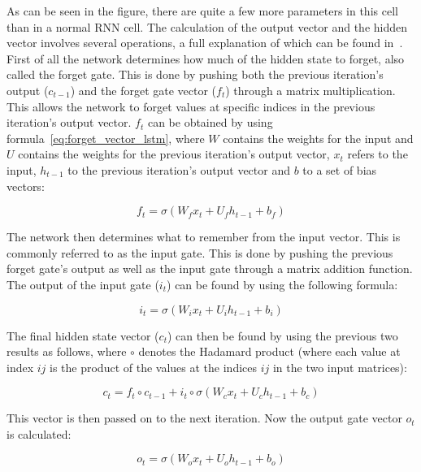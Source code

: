 As can be seen in the figure, there are quite a few more parameters in this cell than in a normal RNN cell. The calculation of the output vector and the hidden vector involves several operations, a full explanation of which can be found in~\cite{olah2015understanding}. First of all the network determines how much of the hidden state to forget, also called the forget gate. This is done by pushing both the previous iteration's output (\(c_{t-1}\)) and the forget gate vector (\(f_t\)) through a matrix multiplication. This allows the network to forget values at specific indices in the previous iteration's output vector. \(f_t\) can be obtained by using formula~\ref{eq:forget_vector_lstm}, where \(W\) contains the weights for the input and \(U\) contains the weights for the previous iteration's output vector, \(x_t\) refers to the input, \(h_{t-1}\) to the previous iteration's output vector and \(b\) to a set of bias vectors:

\begin{equation} \label{eq:forget_vector_lstm}
f_t = \sigma(W_f x_t + U_f h_{t-1} + b_f)
\end{equation}

The network then determines what to remember from the input vector. This is commonly referred to as the input gate. This is done by pushing the previous forget gate's output as well as the input gate through a matrix addition function. The output of the input gate (\(i_t\)) can be found by using the following formula:

\begin{equation} \label{eq:input_vector_lstm}
i_t = \sigma(W_i x_t + U_i h_{t-1} + b_i)
\end{equation}

The final hidden state vector (\(c_t\)) can then be found by using the previous two results as follows, where \(\circ \) denotes the Hadamard product (where each value at index \(ij\) is the product of the values at the indices \(ij\) in the two input matrices): 

\begin{equation} \label{eq:hidden_state_vector_lstm}
c_t = f_t \circ c_{t-1} + i_t \circ \sigma(W_c x_t + U_c h_{t-1} + b_c)
\end{equation}

This vector is then passed on to the next iteration. Now the output gate vector \(o_t\) is calculated:

\begin{equation} \label{eq:something}
o_t = \sigma(W_o x_t + U_o h_{t-1} + b_o)
\end{equation}

